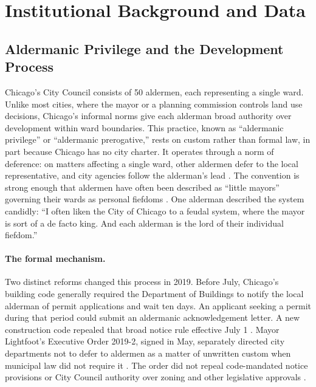 
\section{Institutional Background and Data}
\label{sec:data}

\subsection{Aldermanic Privilege and the Development Process}

Chicago's City Council consists of 50 aldermen, each representing a single ward.
Unlike most cities, where the mayor or a planning commission controls land use
decisions, Chicago's informal norms give each alderman broad authority over
development within ward boundaries.
This practice, known as ``aldermanic
privilege'' or ``aldermanic prerogative,'' rests on custom rather than formal law, in part because Chicago has no city charter.
It operates through a norm of deference: on matters affecting a
single ward, other aldermen defer to the local representative, and city agencies
follow the alderman's lead \citep{thale_aldermanic_2005}.
The convention is strong
enough that aldermen have often been described as ``little mayors'' governing
their wards as personal fiefdoms \citep{einhorn_property_1991}.
One alderman
described the system candidly: ``I often liken the City of Chicago to a feudal
system, where the mayor is sort of a de facto king.
And each alderman is the lord
of their individual fiefdom.''
\citep{keefe_pregnancy_2013}

\paragraph{The formal mechanism.}
Two distinct reforms changed this process in 2019.
Before July, Chicago's building code generally required the Department of Buildings to notify the local alderman of permit applications and wait ten days.
An applicant seeking a permit during that period could submit an aldermanic acknowledgement letter.
A new construction code repealed that broad notice rule effective July 1 \citep{city_of_chicago_sixty-day_2019}.
Mayor Lightfoot's Executive Order 2019-2, signed in May, separately directed city departments not to defer to aldermen as a matter of unwritten custom when municipal law did not require it \citep{mayors_press_office_mayor_2019}.
The order did not repeal code-mandated notice provisions or City Council authority over zoning and other legislative approvals \citep{city_of_chicago_sixty-day_2019, schutz_lightfoot_2019}.

